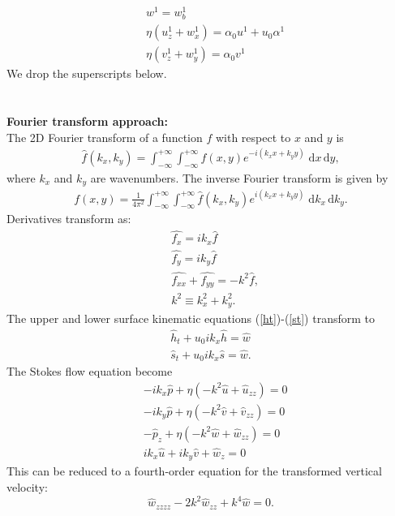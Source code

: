 \documentclass[paper=a4, fontsize=11pt]{article}
\begin{document}
\begin{align}
&w^1  = w_b^1\\
&\eta(u_z^1 + w_x^1) = \alpha_0 u^1 + u_0\alpha^1 \\
&\eta(v_z^1 +w_y^1) = \alpha_0 v^1
\end{align}
We drop the superscripts below. \\ \\
\\ \noindent\textbf{Fourier transform approach:}\\
The 2D Fourier transform of a function $f$ with respect to $x$ and $y$ is
\begin{align}
\widehat{f}(k_x,k_y)  = \int_{-\infty}^{+\infty}\int_{-\infty}^{+\infty} f(x,y)e^{-i(k_x x + k_y y)} \; \mathrm{d}x\,\mathrm{d}y,
\end{align}
where $k_x$ and $k_y$ are wavenumbers.
The inverse Fourier transform is given by
\begin{align}
{f}(x,y) = \frac{1}{4\pi^2}\int_{-\infty}^{+\infty}\int_{-\infty}^{+\infty} \widehat{f}(k_x,k_y)e^{i(k_x x + k_y y)} \; \mathrm{d}k_x \, \mathrm{d}k_y.
\end{align}
Derivatives transform as:
\begin{align}
&\widehat{f_x} = ik_x\widehat{f} \\
&\widehat{f_y} = ik_y\widehat{f} \\
&\widehat{f_{xx}} + \widehat{f_{yy}} = -k^2 \widehat{f}, \\ &k^2 \equiv k_x^2 + k_y^2.
\end{align}
The upper and lower surface kinematic equations (\ref{ht})-(\ref{st}) transform to
\begin{align}
\widehat{h}_t + u_0 ik_x \widehat{h} = \widehat{w}\label{hthat}\\
\widehat{s}_t + u_0 ik_x \widehat{s} = \widehat{w}.\label{sthat}
\end{align}
The Stokes flow equation become
\begin{align}
&-ik_x\widehat{p} + \eta ( -k^2\widehat{u} + \widehat{u}_{zz}) = 0 \\
&-ik_y\widehat{p} + \eta ( -k^2\widehat{v} + \widehat{v}_{zz}) = 0 \\
&-\widehat{p}_z + \eta (-k^2\widehat{w} + \widehat{w}_{zz}) = 0 \\
&ik_x\widehat{u} + ik_y\widehat{v} + \widehat{w}_z = 0
\end{align}
This can be reduced to a fourth-order equation for the transformed vertical velocity:
\begin{equation}
\widehat{w}_{zzzz} - 2k^2 \widehat{w}_{zz} + k^4 \widehat{w}=0. \label{ode}
\end{equation}
\end{document}
